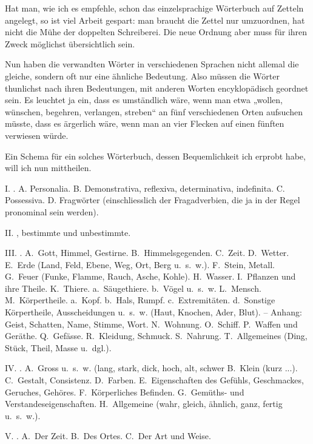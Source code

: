 Hat man, wie ich es empfehle, schon das einzelsprachige Wörterbuch auf Zetteln angelegt, so ist viel Arbeit gespart: man braucht die Zettel nur umzuordnen, hat nicht die Mühe der doppelten Schreiberei. Die neue Ordnung aber muss für ihren Zweck möglichst übersichtlich sein.

Nun haben die verwandten Wörter in verschiedenen Sprachen nicht allemal die gleiche, sondern oft nur eine ähnliche Bedeutung. Also müssen die Wörter thunlichst nach ihren Bedeutungen, mit anderen Worten encyklopädisch geordnet sein. Es leuchtet ja ein, dass es umständlich wäre, wenn man etwa „wollen, wünschen, begehren, verlangen, streben“ an fünf verschiedenen Orten aufsuchen müsste, dass es ärgerlich wäre, wenn man an vier Flecken auf einen fünften verwiesen würde.

Ein Schema für ein solches Wörterbuch, dessen Bequemlichkeit ich erprobt habe, will ich nun mittheilen.

I. . A. Personalia. B. Demonstrativa, reflexiva, determinativa, \label{sp.167} indefinita. C. Possessiva. D. Fragwörter (einschliesslich der Fragadverbien, die ja in der Regel pronominal sein werden).

\label{fp.178}

II. , bestimmte und unbestimmte.

III. . A.~Gott, Himmel, Gestirne. B.~Himmelsgegenden. C.~Zeit. D.~Wetter. E.~Erde (Land, Feld, Ebene, Weg, Ort, Berg u.~s.~w.). F.~Stein, Metall. G.~Feuer (Funke, Flamme, Rauch, Asche, Kohle). H.~Wasser. I.~Pflanzen und ihre Theile. K.~Thiere. a.~Säugethiere. b.~Vögel u.~s.~w. L.~Mensch. M.~Körpertheile. a.~Kopf. b.~Hals, Rumpf. c.~Extremitäten. d.~Sonstige Körpertheile, Ausscheidungen u.~s.~w. (Haut, Knochen, Ader, Blut). – Anhang: Geist, Schatten, Name, Stimme, Wort. N.~Wohnung. O.~Schiff. P.~Waffen und Geräthe. Q.~Gefässe. R.~Kleidung, Schmuck. S.~Nahrung. T.~Allgemeines (Ding, Stück, Theil, Masse u.~dgl.).

IV. . A.~Gross u.~s.~w. (lang, stark, dick, hoch, alt, schwer  B.~Klein (kurz ...). C.~Gestalt, Consistenz. D.~Farben. E.~Eigenschaften des Gefühls, Geschmackes, Geruches, Gehöres. F.~Körperliches Befinden. G.~Gemüths- und Verstandeseigenschaften. H.~Allgemeine (wahr, gleich, ähnlich, ganz, fertig u.~s.~w.).

V. . A.~Der Zeit. B.~Des Ortes. C.~Der Art und Weise.

